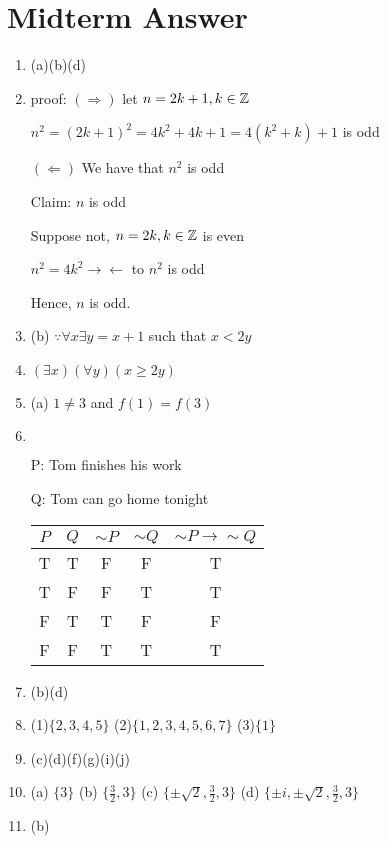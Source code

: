 




\section*{Midterm Answer}

\begin{enumerate}
	\item (a)(b)(d)
	\item proof:
	$(\Rightarrow)$ let $n = 2k+1, k \in \mathbb{Z}$
	
	$n^2 = (2k+1)^2 = 4k^2 + 4k + 1 = 4(k^2 + k) + 1$ is odd
	
	$(\Leftarrow)$ We have that $n^2$ is odd
	
	Claim: $n$ is odd
	
	Suppose not, $n = 2k, k\in \mathbb{Z}$ is even
	
	$n^2 = 4k^2 \rightarrow\leftarrow$ to $n^2$ is odd
	
	Hence, $n$ is odd.
	
	\item (b) $\because \forall x \exists y = x + 1$ such that $x < 2y$
	
	\item $(\exists x)(\forall y)(x \geq 2y)$
	
	\item (a) $1 \neq 3$ and $f(1) = f(3)$
	
	\item $ $
	
	P: Tom finishes his work
	
	Q: Tom can go home tonight
	
	\begin{tabular}{|c|c|c|c|c|}
	\hline
	$P$&$Q$&$\sim P$&$\sim Q$&$\sim P \rightarrow \sim Q$\\
	\hline
	T & T & F & F & T \\
	\hline
	T & F & F & T & T \\
	\hline
	F & T & T & F & F \\
	\hline
	F & F & T & T & T \\
	\hline
	\end{tabular}
	
	\item (b)(d)
	\item (1)$\{2,3,4,5\}$ (2)$\{1,2,3,4,5,6,7\}$ (3)$\{1\}$
	\item (c)(d)(f)(g)(i)(j)
	\item (a) $\{3\}$ (b) $\{\frac{3}{2},3\}$ (c) $\{\pm \sqrt{2},\frac{3}{2},3\}$ (d) $\{\pm i,\pm \sqrt{2},\frac{3}{2},3\}$
	\item (b)
	

\end{enumerate}
